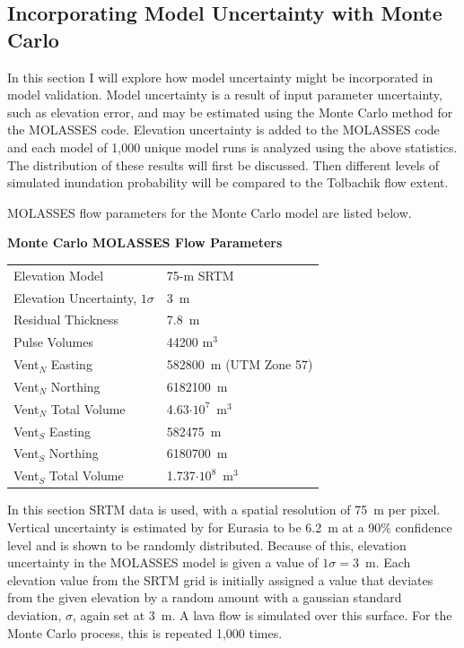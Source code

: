 \documentclass[12pt,letter]{article}
\begin{document}
	\subsection{Incorporating Model Uncertainty with Monte Carlo}
		In this section I will explore how model uncertainty might be incorporated in model validation. Model uncertainty is a result of input parameter uncertainty, such as elevation error, and may be estimated using the Monte Carlo method for the MOLASSES code. Elevation uncertainty is added to the MOLASSES code and each model of 1,000 unique model runs is analyzed using the above statistics. The distribution of these results will first be discussed. Then different levels of simulated inundation probability will be compared to the Tolbachik flow extent.

		MOLASSES flow parameters for the Monte Carlo model are listed below. 
		\begin{center}
			\textbf{Monte Carlo MOLASSES Flow Parameters}\\
			\begin{tabular}{l l}
				\toprule
				Elevation Model & 75-m SRTM\\
				Elevation Uncertainty, $1\sigma$ & 3~m\\
				Residual Thickness & 7.8~m\\
				Pulse Volumes & 44200 m$^3$\\
				\midrule
				Vent$_N$ Easting & 582800~m (UTM Zone 57)\\
				Vent$_N$ Northing & 6182100~m\\
				Vent$_N$ Total Volume & 4.63$\cdot10^7$~m$^3$\\
				\midrule
				Vent$_S$ Easting & 582475~m\\
				Vent$_S$ Northing & 6180700~m\\
				Vent$_S$ Total Volume & 1.737$\cdot10^8$~m$^3$\\
				\bottomrule
			\end{tabular}
		\end{center}
		In this section SRTM data is used, with a spatial resolution of 75~m per pixel. Vertical uncertainty is estimated by \citet{rodriguez2006global} for Eurasia to be 6.2~m at a 90\% confidence level and is shown to be randomly distributed. Because of this, elevation uncertainty in the MOLASSES model is given a value of $1\sigma=3$~m. Each elevation value from the SRTM grid is initially assigned a value that deviates from the given elevation by a random amount with a gaussian standard deviation, $\sigma$, again set at 3~m. A lava flow is simulated over this surface. For the Monte Carlo process, this is repeated 1,000 times.
\end{document}
